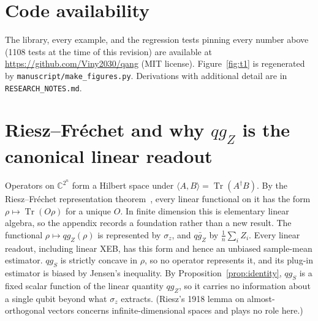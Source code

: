 \documentclass[11pt]{article}
\newcommand{\qgZ}{qg_Z}
\newcommand{\qgS}{qg_S}
\newcommand{\Tr}{\operatorname{Tr}}
\begin{document}
\section{Code availability}\label{sec:code}

The library, every example, and the regression tests pinning every number above (1108 tests at
the time of this revision) are available at
\url{https://github.com/Viny2030/qang} (MIT license). Figure~\ref{fig:t1} is regenerated by
\texttt{manuscript/make\_figures.py}. Derivations with additional detail are in
\texttt{RESEARCH\_NOTES.md}.

\appendix
\section{Riesz--Fr\'echet and why \texorpdfstring{$\qgZ$}{qgZ} is the canonical linear readout}\label{app:riesz}

Operators on $\mathbb{C}^{2^n}$ form a Hilbert space under $\langle A,B\rangle=\Tr(A^\dagger B)$.
By the Riesz--Fr\'echet representation theorem~\cite{riesz1907,frechet1907}, every linear functional
on it has the form $\rho\mapsto\Tr(O\rho)$ for a unique $O$. In finite dimension this is elementary
linear algebra, so the appendix records a foundation rather than a new result. The functional
$\rho\mapsto\qgZ(\rho)$ is represented by $\sigma_z$, and $\bar{\qgZ}$ by $\frac1n\sum_iZ_i$.
Every linear readout, including linear XEB, has this form and hence an unbiased sample-mean
estimator. $\qgS$ is strictly concave in $\rho$, so no operator represents it, and its plug-in
estimator is biased by Jensen's inequality. By Proposition~\ref{prop:identity}, $\qgS$ is a fixed
scalar function of the linear quantity $\qgZ$, so it carries no information about a single qubit
beyond what $\sigma_z$ extracts. (Riesz's 1918 lemma on almost-orthogonal vectors concerns
infinite-dimensional spaces and plays no role here.)



\end{document}
